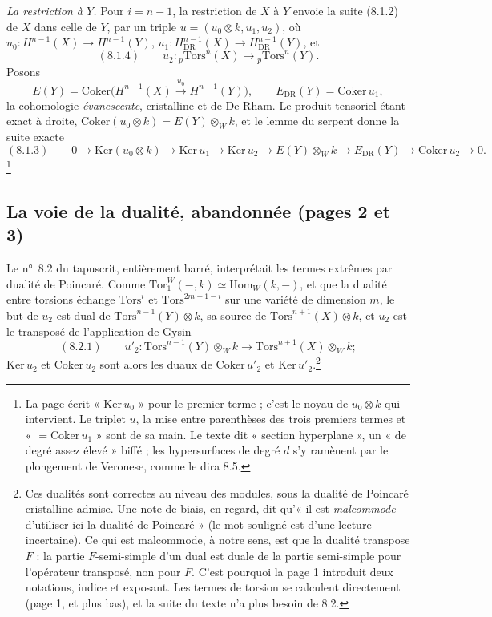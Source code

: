 \documentclass[11pt,a4paper]{article}
\begin{document}
\emph{La restriction à $Y$.} Pour $i = n - 1$, la restriction de $X$ à $Y$
envoie la suite (8.1.2) de $X$ dans celle de $Y$, par un triple
$u = (u_{0} \otimes k, u_{1}, u_{2})$, où $u_{0} : H^{n-1}(X) \to H^{n-1}(Y)$,
$u_{1} : H^{n-1}_{\mathrm{DR}}(X) \to H^{n-1}_{\mathrm{DR}}(Y)$, et
\[
(8.1.4) \qquad u_{2} : {}_{p}\mathrm{Tors}^{n}(X) \to {}_{p}\mathrm{Tors}^{n}(Y) .
\]
Posons
\[
E(Y) = \mathrm{Coker}\bigl(H^{n-1}(X) \xrightarrow{u_{0}} H^{n-1}(Y)\bigr),
\qquad
E_{\mathrm{DR}}(Y) = \mathrm{Coker}\, u_{1} ,
\]
la cohomologie \emph{évanescente}, cristalline et de De Rham. Le produit
tensoriel étant exact à droite, $\mathrm{Coker}(u_{0} \otimes k) = E(Y)
\otimes_{W} k$, et le lemme du serpent donne la suite exacte
\[
(8.1.3) \qquad 0 \to \mathrm{Ker}(u_{0} \otimes k) \to \mathrm{Ker}\, u_{1}
\to \mathrm{Ker}\, u_{2} \to E(Y) \otimes_{W} k \to E_{\mathrm{DR}}(Y)
\to \mathrm{Coker}\, u_{2} \to 0 .
\]
\footnote{La page écrit « $\mathrm{Ker}\, u_{0}$ » pour le premier terme ;
c'est le noyau de $u_{0} \otimes k$ qui intervient. Le triplet $u$, la mise
entre parenthèses des trois premiers termes et « $= \mathrm{Coker}\, u_{1}$ »
sont de sa main. Le texte dit « section hyperplane », un « de degré assez
élevé » biffé ; les hypersurfaces de degré $d$ s'y ramènent par le plongement
de Veronese, comme le dira 8.5.}

\subsection*{La voie de la dualité, abandonnée (pages 2 et 3)}

Le n°~8.2 du tapuscrit, entièrement barré, interprétait les termes extrêmes
par dualité de Poincaré. Comme $\mathrm{Tor}^{W}_{1}(-, k) \simeq
\mathrm{Hom}_{W}(k, -)$, et que la dualité entre torsions échange
$\mathrm{Tors}^{i}$ et $\mathrm{Tors}^{2m+1-i}$ sur une variété de dimension
$m$, le but de $u_{2}$ est dual de $\mathrm{Tors}^{n-1}(Y) \otimes k$, sa
source de $\mathrm{Tors}^{n+1}(X) \otimes k$, et $u_{2}$ est le transposé de
l'application de Gysin
\[
(8.2.1) \qquad u'_{2} : \mathrm{Tors}^{n-1}(Y) \otimes_{W} k \to
\mathrm{Tors}^{n+1}(X) \otimes_{W} k ;
\]
$\mathrm{Ker}\, u_{2}$ et $\mathrm{Coker}\, u_{2}$ sont alors les duaux de
$\mathrm{Coker}\, u'_{2}$ et $\mathrm{Ker}\, u'_{2}$.\footnote{Ces dualités sont
correctes au niveau des modules, sous la dualité de Poincaré cristalline
admise. Une note de biais, en regard, dit qu'« il est \emph{malcommode}
d'utiliser ici la dualité de Poincaré » (le mot souligné est d'une lecture
incertaine). Ce qui est malcommode, à notre sens, est que la dualité transpose
$F$ : la partie $F$-semi-simple d'un dual est duale de la partie semi-simple
pour l'opérateur transposé, non pour $F$. C'est pourquoi la page 1 introduit
deux notations, indice et exposant. Les termes de torsion se calculent
directement (page 1, et plus bas), et la suite du texte n'a plus besoin de
8.2.}
\end{document}
